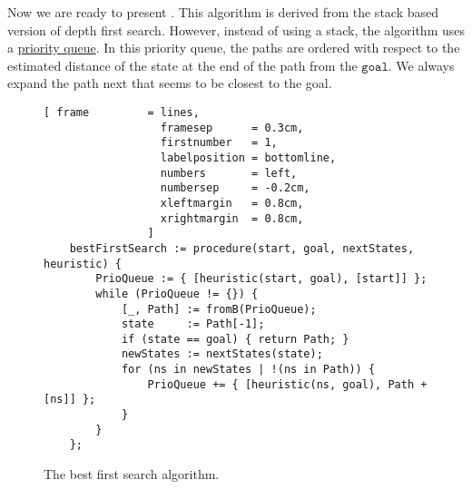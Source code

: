 Now we are ready to present .  This algorithm is derived from the stack based
version of depth first search.  However, instead of using a stack, the algorithm uses a 
\href{https://en.wikipedia.org/wiki/Priority_queue}{priority queue}.  In this priority queue, the paths are
ordered with respect to the estimated distance of the state at the end of the path from the $\mathtt{goal}$.
We always expand the path next that seems to be closest to the goal.  

\begin{figure}[!ht]
\centering
\begin{Verbatim}[ frame         = lines, 
                  framesep      = 0.3cm, 
                  firstnumber   = 1,
                  labelposition = bottomline,
                  numbers       = left,
                  numbersep     = -0.2cm,
                  xleftmargin   = 0.8cm,
                  xrightmargin  = 0.8cm,
                ]
    bestFirstSearch := procedure(start, goal, nextStates, heuristic) {
        PrioQueue := { [heuristic(start, goal), [start]] };
        while (PrioQueue != {}) {
            [_, Path] := fromB(PrioQueue);
            state     := Path[-1];
            if (state == goal) { return Path; }
            newStates := nextStates(state);
            for (ns in newStates | !(ns in Path)) {
                PrioQueue += { [heuristic(ns, goal), Path + [ns]] };
            }
        }
    };
\end{Verbatim}
\vspace*{-0.3cm}
\caption{The best first search algorithm.}
\label{fig:best-first-search.stlx}
\end{figure}

